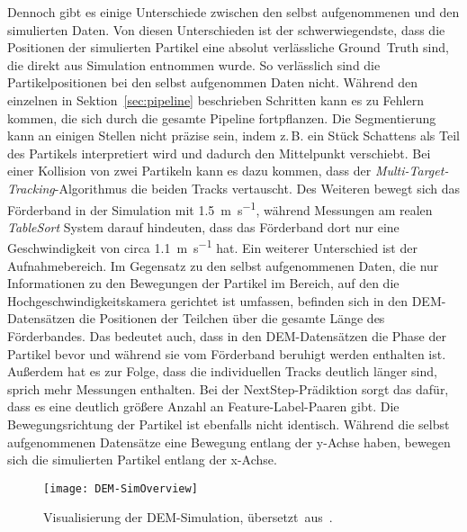 Dennoch gibt es einige Unterschiede zwischen den selbst aufgenommenen und den simulierten Daten.
Von diesen Unterschieden ist der schwerwiegendste, dass die Positionen der simulierten Partikel eine absolut verlässliche Ground~Truth sind, 
die direkt aus Simulation entnommen wurde.
So verlässlich sind die Partikelpositionen bei den selbst aufgenommen Daten nicht.
Während den einzelnen in Sektion~\ref{sec:pipeline} beschrieben Schritten kann es zu Fehlern kommen, die sich durch die gesamte Pipeline fortpflanzen.
Die Segmentierung kann an einigen Stellen nicht präzise sein, indem z.\,B. ein Stück Schattens als Teil des Partikels interpretiert wird und dadurch den Mittelpunkt verschiebt. 
Bei einer Kollision von zwei Partikeln kann es dazu kommen, dass der \textit{Multi-Target-Tracking}-Algorithmus die beiden Tracks vertauscht.  
Des Weiteren bewegt sich das Förderband in der Simulation mit \SI{1.5}{\meter\per\second}, 
während Messungen am realen \textit{TableSort} System darauf hindeuten, dass das Förderband dort nur eine Geschwindigkeit von 
circa \SI{1.1}{\meter\per\second} hat.
Ein weiterer Unterschied ist der Aufnahmebereich.
Im Gegensatz zu den selbst aufgenommenen Daten, die nur Informationen 
zu den Bewegungen der Partikel im Bereich, auf den die Hochgeschwindigkeitskamera gerichtet ist umfassen, 
befinden sich in den DEM-Datensätzen die Positionen der Teilchen über die gesamte Länge des Förderbandes.
Das bedeutet auch, dass in den DEM-Datensätzen die Phase der Partikel bevor und während sie vom Förderband beruhigt werden enthalten ist.
Außerdem hat es zur Folge, dass die individuellen Tracks deutlich länger sind, sprich mehr Messungen enthalten.
Bei der NextStep-Prädiktion sorgt das dafür, dass es eine deutlich größere Anzahl an Feature-Label-Paaren gibt.
Die Bewegungsrichtung der Partikel ist ebenfalls nicht identisch.
Während die selbst aufgenommenen Datensätze eine Bewegung entlang der y-Achse haben, bewegen sich die simulierten Partikel entlang der x-Achse.

\begin{figure}[h]
    \centering
	\texttt{[image: DEM-SimOverview]}
	\caption{Visualisierung der DEM-Simulation, übersetzt~aus~\cite{Pfaff2018}.}
	\label{fig:DEMSimulation}
\end{figure}



